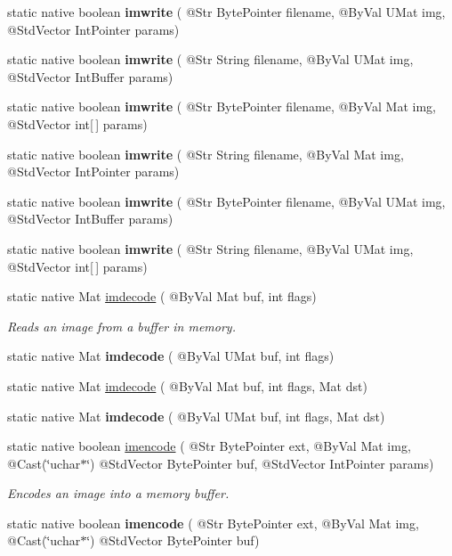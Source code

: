 \begin{DoxyCompactItemize}
\item 
static native boolean {\bfseries imwrite} ( @Str Byte\+Pointer filename, @By\+Val U\+Mat img, @Std\+Vector Int\+Pointer params)
\item 
static native boolean {\bfseries imwrite} ( @Str String filename, @By\+Val U\+Mat img, @Std\+Vector Int\+Buffer params)
\item 
static native boolean {\bfseries imwrite} ( @Str Byte\+Pointer filename, @By\+Val Mat img, @Std\+Vector int\mbox{[}$\,$\mbox{]} params)
\item 
static native boolean {\bfseries imwrite} ( @Str String filename, @By\+Val Mat img, @Std\+Vector Int\+Pointer params)
\item 
static native boolean {\bfseries imwrite} ( @Str Byte\+Pointer filename, @By\+Val U\+Mat img, @Std\+Vector Int\+Buffer params)
\item 
static native boolean {\bfseries imwrite} ( @Str String filename, @By\+Val U\+Mat img, @Std\+Vector int\mbox{[}$\,$\mbox{]} params)
\item 
static native Mat \hyperlink{group__imgcodecs_gac13b3cea648e84cd2ead3c4849023497}{imdecode} ( @By\+Val Mat buf, int flags)
\begin{DoxyCompactList}\small\item\em Reads an image from a buffer in memory. \end{DoxyCompactList}\item 
static native Mat {\bfseries imdecode} ( @By\+Val U\+Mat buf, int flags)
\item 
static native Mat \hyperlink{group__imgcodecs_gaf794fdf6c3f9d68b53c283bc7ee3d8ef}{imdecode} ( @By\+Val Mat buf, int flags, Mat dst)
\item 
static native Mat {\bfseries imdecode} ( @By\+Val U\+Mat buf, int flags, Mat dst)
\item 
static native boolean \hyperlink{group__imgcodecs_ga99b838a1ddfa3318e2ba7d2dd5ef42cc}{imencode} ( @Str Byte\+Pointer ext, @By\+Val Mat img, @Cast(\char`\"{}uchar$\ast$\char`\"{}) @Std\+Vector Byte\+Pointer buf, @Std\+Vector Int\+Pointer params)
\begin{DoxyCompactList}\small\item\em Encodes an image into a memory buffer. \end{DoxyCompactList}\item 
static native boolean {\bfseries imencode} ( @Str Byte\+Pointer ext, @By\+Val Mat img, @Cast(\char`\"{}uchar$\ast$\char`\"{}) @Std\+Vector Byte\+Pointer buf)
\item 

\end{DoxyCompactItemize}
